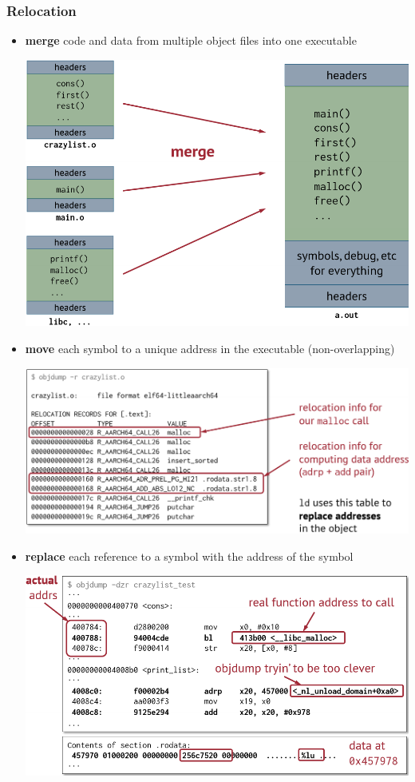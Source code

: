 \documentclass[letterpaper,12pt]{article}
\begin{document}
\subsubsection{Relocation}
\begin{itemize}
    \item \textbf{merge} code and data from multiple object files into one executable
    
    \includegraphics*[scale=0.5]{./Images/Static linking merge.png}
    \item \textbf{move} each symbol to a unique address in the executable (non-overlapping)
    
    \includegraphics*[scale=0.6]{./Images/Static linking relocation.png}
    \item \textbf{replace} each reference to a symbol with the address of the symbol
    
    \includegraphics*[scale=0.6]{./Images/Static linking executable.png}
\end{itemize}
\end{document}
